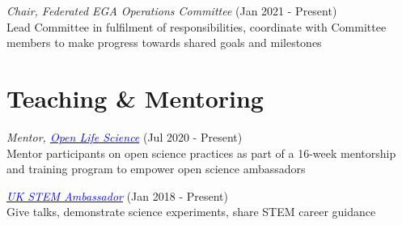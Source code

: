 \documentclass[margin,line]{res}
\begin{document}
\begin{resume}
{\em Chair, Federated EGA Operations Committee} (Jan 2021 - Present)\\
Lead Committee in fulfilment of responsibilities, coordinate with Committee members to make progress towards shared goals and milestones

\section{\sc Teaching \& Mentoring}

{\em Mentor, \href{https://openlifesci.org/}{\textcolor{blue}{Open Life Science}}} (Jul 2020 - Present)\\
Mentor participants on open science practices as part of a 16-week mentorship and training program to empower open science ambassadors

{\em \href{https://www.stem.org.uk//}{\textcolor{blue}{UK STEM Ambassador}}} (Jan 2018 - Present)\\
Give talks, demonstrate science experiments, share STEM career guidance






\end{resume}
\end{document}
